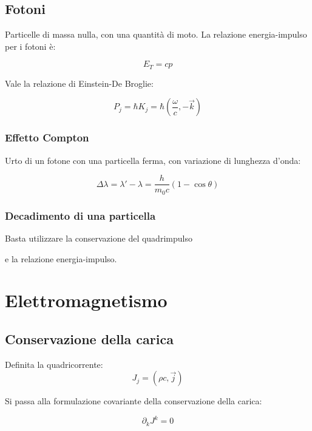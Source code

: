 \documentclass{article}
\begin{document}
\subsection{Fotoni}
Particelle di massa nulla, con una quantità di moto.
La relazione energia-impulso per i fotoni è:

\begin{equation}
    E_T=cp
\end{equation}

Vale la relazione di Einstein-De Broglie:

\begin{equation}
    P_j=\hbar K_j=\hbar (\frac{\omega}{c},-\vec{k})
\end{equation}

\subsubsection{Effetto Compton}
Urto di un fotone con una particella ferma, con variazione di lunghezza d'onda:

\begin{equation}
    \Delta \lambda = \lambda' - \lambda = \frac{h}{m_0c}(1-\cos \theta)
\end{equation}

\subsubsection{Decadimento di una particella}

Basta utilizzare la conservazione del quadrimpulso

e la relazione energia-impulso.

\section{Elettromagnetismo}

\subsection{Conservazione della carica}
Definita la quadricorrente:
\begin{equation}
    J_j=(\rho c, \vec{j})
\end{equation}

Si passa alla formulazione covariante della conservazione della carica:

\begin{equation}
    \partial _k J^k=0
\end{equation}
\end{document}
